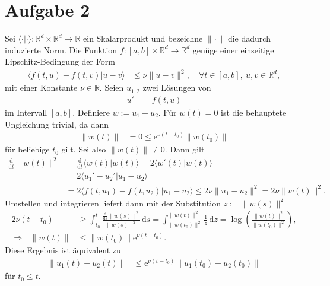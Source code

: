 \documentclass[english, parskip=full]{scrartcl}
\newcommand{\brak}{}
\newcommand{\intx}{}
\newcommand{\tecxt}{}
\newcommand{\e}{\text{e}}
\begin{document}
\section*{Aufgabe 2}
Sei $\brak\langle \cdot | \cdot  \rangle : \mathbb{R}^d \times \mathbb{R}^d \rightarrow\mathbb{R}$ ein Skalarprodukt und bezeichne $\|\cdot\|$ die dadurch induzierte Norm.
Die Funktion $f:[a,b]\times\mathbb{R}^d \rightarrow \mathbb{R}^d $ genüge einer einseitige Lipschitz-Bedingung der Form
\begin{align}
\brak\langle f(t,u) - f(t,v) | u-v \rangle &\le \nu \| u -v\|^2, \quad \forall t\in[a,b],\ u,v\in\mathbb{R}^d,
\end{align}
mit einer Konstante $\nu\in\mathbb{R}$.
Seien $u_{1,2}$ zwei Lösungen von 
\begin{align}
u' &= f(t,u)
\end{align}
im Intervall $[a,b]$.
Definiere $w := u_1 - u_2$.
Für $w(t) = 0$ ist die behauptete Ungleichung trivial, da dann
\begin{align}
\|w(t)\| &= 0 \le \e^{\nu (t-t_0)} \|w(t_0)\|
\end{align}
für beliebige $t_0$ gilt.
Sei also $\|w(t)\| \neq 0$. 
Dann gilt
\begin{align}
\frac{\tecxt\text{d}}{\tecxt\text{d}t} \|w(t)\|^2 &= \frac{\tecxt\text{d}}{\tecxt\text{d}t} \brak\langle w(t) | w(t) \rangle = 2\brak\langle w'(t) | w(t) \rangle = \\
&= 2\brak\langle u_1' - u_2' | u_1 - u_2 \rangle = \\
&= 2\brak\langle f(t,u_1) - f(t,u_2) | u_1 - u_2 \rangle \le 2\nu \|u_1 - u_2\|^2 = 2\nu \|w(t)\|^2.
\end{align}
Umstellen und integrieren liefert dann mit der Substitution $z := \|w(s)\|^2$
\begin{align}
2\nu (t-t_0) &\ge \intx\int_{t_0}^{t} \frac{\frac{\tecxt\text{d}}{\tecxt\text{d}s}\|w(s)\|^2}{\|w(s)\|^2}\, \mathrm{d}s = \intx\int_{\|w(t_0)\|^2}^{\|w(t)\|^2} \frac{1}{z} \, \mathrm{d}z = \log\left( \frac{\|w(t)\|^2}{\|w(t_0)\|^2} \right),\\
\Rightarrow\ \ \ \|w(t)\| &\le \|w(t_0)\| \e^{\nu (t-t_0)}.
\end{align}
Diese Ergebnis ist äquivalent zu 
\begin{align}
\|u_1(t) - u_2(t)\| &\le \e^{\nu (t-t_0)} \|u_1(t_0) - u_2(t_0)\|
\end{align}
für $t_0\le t$.
\end{document}
